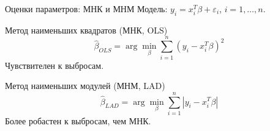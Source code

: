 \documentclass{beamer}
\begin{document}
	\begin{frame}{Оценки параметров: МНК и МНМ}
		Модель: $y_i = x_i^T \beta + \varepsilon_i$, $i=1,\dots,n$.
		\begin{block}{Метод наименьших квадратов (МНК, OLS)}
			\begin{equation*}
				\widehat{\beta}_{OLS} = \arg\min_{\beta} \sum_{i=1}^n (y_i - x_i^T\beta)^2
			\end{equation*}
			Чувствителен к выбросам.
		\end{block}
		\begin{block}{Метод наименьших модулей (МНМ, LAD)}
			\begin{equation*}
				\widehat{\beta}_{LAD} = \arg\min_{\beta} \sum_{i=1}^n |y_i - x_i^T\beta|
			\end{equation*}
			Более робастен к выбросам, чем МНК.
		\end{block}
	\end{frame}
	
	
\end{document}

